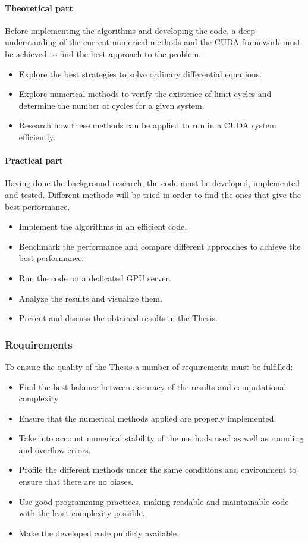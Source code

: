 \paragraph{Theoretical part}

Before implementing the algorithms and developing the code, a deep understanding
of the current numerical methods and the CUDA framework must be achieved to find
the best approach to the problem.

\begin{itemize}
    \item Explore the best strategies to solve ordinary differential equations.
    \item Explore numerical methods to verify the existence of limit cycles and determine the number of cycles for a given system.
    \item Research how these methods can be applied to run in a CUDA system efficiently.
\end{itemize}

\paragraph{Practical part} Having done the background research, the code must be
developed, implemented and tested.  Different methods will be tried in order to
find the ones that give the best performance.

\begin{itemize}
    \item Implement the algorithms in an efficient code.
    \item Benchmark the performance and compare different approaches to achieve the best performance.
    \item Run the code on a dedicated GPU server.
    \item Analyze the results and visualize them.
    \item Present and discuss the obtained results in the Thesis.
\end{itemize}

\subsubsection{Requirements}

To ensure the quality of the Thesis a number of requirements must be fulfilled:
\begin{itemize}
    \item Find the best balance between accuracy of the results and computational complexity
    \item Ensure that the numerical methods applied are properly implemented.
    \item Take into account numerical stability of the methods used as well as rounding and overflow errors.
    \item Profile the different methods under the same conditions and environment to ensure that there are no biases.
    \item Use good programming practices, making readable and maintainable code with the least complexity possible.
    \item Make the developed code publicly available.
\end{itemize}

